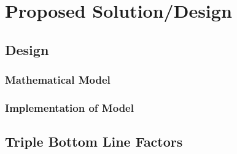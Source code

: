\documentclass[../mthe-493-project-proposal.tex]{subfiles}
\begin{document}
    \chapter{Proposed Solution/Design}
    \label{ch:proposed-design}
    \blindtext

    \section{Design}
    \blindtext

    \subsection{Mathematical Model}
    \blindtext

    \subsection{Implementation of Model}
    \blindtext

    \section{Triple Bottom Line Factors}
    \blindtext
\end{document}
